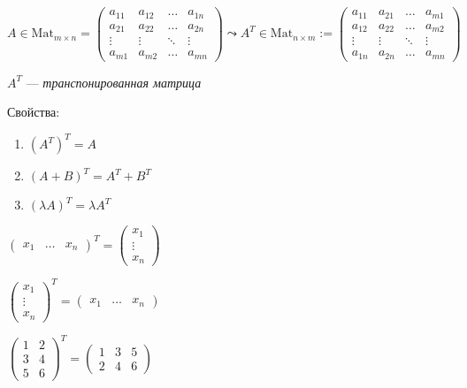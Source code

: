 $A \in \text{Mat}_{m \times n} = \begin{pmatrix}
    a_{11} & a_{12} & \dots & a_{1n} \\
    a_{21} & a_{22} & \dots & a_{2n} \\
    \vdots & \vdots & \ddots & \vdots \\
    a_{m1} & a_{m2} & \dots & a_{mn}
\end{pmatrix} \leadsto A^T \in \text{Mat}_{n \times m} := \begin{pmatrix}
    a_{11} & a_{21} & \dots & a_{m1} \\
    a_{12} & a_{22} & \dots & a_{m2} \\
    \vdots & \vdots & \ddots & \vdots \\
    a_{1n} & a_{2n} & \dots & a_{mn}
\end{pmatrix}$

$A^T$ ---  \textit{транспонированная матрица}

\bigskip
Свойства:
\begin{enumerate}[label=\arabic*), nosep]
    \item $(A^T)^T = A$
    \item $(A + B)^T = A^T + B^T$
    \item $(\lambda A)^T = \lambda A^T$
\end{enumerate}

\begin{example}
    \( \begin{pmatrix}
        x_1 & \dots & x_n
    \end{pmatrix}^T = \begin{pmatrix}
        x_1 \\ \vdots \\ x_n
    \end{pmatrix} \)
\end{example}
\begin{example}
    \( \begin{pmatrix}
    x_1 \\ \vdots \\ x_n
    \end{pmatrix}^T = \begin{pmatrix}
    x_1 & \dots & x_n
    \end{pmatrix} \)
\end{example}
\begin{example}
    \( \begin{pmatrix}
        1 & 2 \\ 3 & 4 \\ 5 & 6
    \end{pmatrix}^T = \begin{pmatrix}
        1 & 3 & 5 \\
        2 & 4 & 6
    \end{pmatrix} \)
\end{example}

